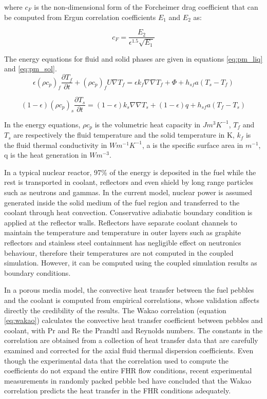 \documentclass{elsarticle}
\begin{document}
where $c_F$ is the non-dimensional form of the Forcheimer drag coefficient that can be computed from Ergun correlation coefficients $E_1$ and $E_2$ as:

\begin{equation}
    c_F = \frac{E_2}{\epsilon^{1.5}\sqrt{E_1}}
\end{equation}



The energy equations for fluid and solid phases are given in equations \ref{eq:pm_liq} and \ref{eq:pm_sol}.
\begin{equation}
  \epsilon(\rho c_p)_f \frac{\partial T_f}{\partial t} + (\rho c_p)_f U\nabla T_f = \epsilon k_f \nabla\nabla T_f + \Phi + h_{sf}a(T_s - T_f)
  \label{eq:pm_liq}
\end{equation}

\begin{equation}
  (1-\epsilon)(\rho c_p)_s \frac{\partial T_s}{\partial t} =(1-\epsilon)k_s \nabla\nabla T_s + (1-\epsilon)q + h_{sf}a(T_f - T_s)
  \label{eq:pm_sol}
\end{equation}

In the energy equations, $\rho c_p$ is the volumetric heat capacity in $Jm^3K^{-1}$, $T_f$ and $T_s$ are respectively the fluid temperature and the solid temperature in K, $k_f$ is the fluid thermal conductivity in $Wm^{-1}K^{-1}$, a is the specific surface area in $m^{-1}$, q is the heat generation in $Wm^{-3}$.

In a typical nuclear reactor, 97\% of the energy is deposited in the fuel while the rest is transported in coolant, reflectors and even shield by long range particles such as neutrons and gammas. 
In the current model, nuclear power is assumed generated inside the solid medium of the fuel region and transferred to the coolant through heat convection. Conservative adiabatic boundary condition is applied at the reflector walls. Reflectors have separate coolant channels to maintain the temperature and temperature in outer layers such as graphite reflectors and stainless steel containment has negligible effect on neutronics behaviour, therefore their temperatures are not computed in the coupled simulation. However, it can be computed using the coupled simulation results as boundary conditions.

In a porous media model, the convective heat transfer between the fuel pebbles and the coolant is computed from empirical correlations, whose validation affects directly the credibility of the results. The Wakao correlation (equation \ref{eq:wakao}) \cite{Wakao1979} calculates the convective heat transfer coefficient between pebbles and coolant, with Pr and Re the Prandtl and Reynolds numbers.
The constants in the correlation are obtained from a collection of heat transfer data that are carefully examined and corrected for the axial fluid thermal dispersion coefficients. Even though the experimental data that the correlation used to compute the coefficients do not expand the entire FHR flow conditions, recent experimental measurements in randomly packed pebble bed \cite{Huddar2016} have concluded that the Wakao correlation predicts the heat transfer in the FHR conditions adequately.
\end{document}

